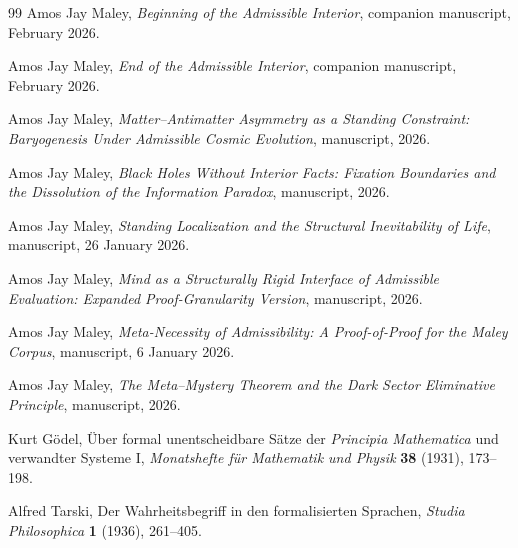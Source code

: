 \begin{thebibliography}{99}
Amos Jay Maley,
\newblock \emph{Beginning of the Admissible Interior},
\newblock companion manuscript, February 2026.

Amos Jay Maley,
\newblock \emph{End of the Admissible Interior},
\newblock companion manuscript, February 2026.

Amos Jay Maley,
\newblock \emph{Matter--Antimatter Asymmetry as a Standing Constraint: Baryogenesis Under Admissible Cosmic Evolution},
\newblock manuscript, 2026.

Amos Jay Maley,
\newblock \emph{Black Holes Without Interior Facts: Fixation Boundaries and the Dissolution of the Information Paradox},
\newblock manuscript, 2026.

Amos Jay Maley,
\newblock \emph{Standing Localization and the Structural Inevitability of Life},
\newblock manuscript, 26 January 2026.

Amos Jay Maley,
\newblock \emph{Mind as a Structurally Rigid Interface of Admissible Evaluation: Expanded Proof-Granularity Version},
\newblock manuscript, 2026.

Amos Jay Maley,
\newblock \emph{Meta-Necessity of Admissibility: A Proof-of-Proof for the Maley Corpus},
\newblock manuscript, 6 January 2026.

Amos Jay Maley,
\newblock \emph{The Meta--Mystery Theorem and the Dark Sector Eliminative Principle},
\newblock manuscript, 2026.

Kurt G\"odel,
\newblock \"Uber formal unentscheidbare S\"atze der \emph{Principia Mathematica} und verwandter Systeme I,
\newblock \emph{Monatshefte f\"ur Mathematik und Physik} \textbf{38} (1931), 173--198.

Alfred Tarski,
\newblock Der Wahrheitsbegriff in den formalisierten Sprachen,
\newblock \emph{Studia Philosophica} \textbf{1} (1936), 261--405.

\end{thebibliography}

